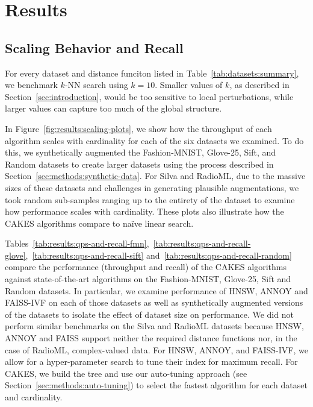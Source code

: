 \section{Results}
\label{sec:results}


\subsection{Scaling Behavior and Recall}
\label{sec:results:scaling-behavior-and-recall}

For every dataset and distance funciton listed in Table~\ref{tab:datasets:summary}, we benchmark $k$-NN search using $k=10$.
Smaller values of $k$, as described in Section~\ref{sec:introduction}, would be too sensitive to local perturbations, while larger values can capture too much of the global structure.

In Figure~\ref{fig:results:scaling-plots}, we show how the throughput of each algorithm scales with cardinality for each of the six datasets we examined.
To do this, we synthetically augmented the Fashion-MNIST, Glove-25, Sift, and Random datasets to create larger datasets using the process described in Section~\ref{sec:methods:synthetic-data}.
For Silva and RadioML, due to the massive sizes of these datasets and challenges in generating plausible augmentations, we took random sub-samples ranging up to the entirety of the dataset to examine how performance scales with cardinality.
These plots also illustrate how the CAKES algorithms compare to na\"{i}ve linear search.

Tables~\ref{tab:results:qps-and-recall-fmn},~\ref{tab:results:qps-and-recall-glove},~\ref{tab:results:qps-and-recall-sift} and~\ref{tab:results:qps-and-recall-random} compare the performance (throughput and recall) of the CAKES algorithms against state-of-the-art algorithms on the Fashion-MNIST, Glove-25, Sift and Random datasets.
In particular, we examine performance of HNSW, ANNOY and FAISS-IVF on each of those datasets as well as synthetically augmented versions of the datasets to isolate the effect of dataset size on performance.
We did not perform similar benchmarks on the Silva and RadioML datasets because HNSW, ANNOY and FAISS support neither the required distance functions nor, in the case of RadioML, complex-valued data.
For HNSW, ANNOY, and FAISS-IVF, we allow for a hyper-parameter search to tune their index for maximum recall.
For CAKES, we build the tree and use our auto-tuning approach (see Section~\ref{sec:methods:auto-tuning}) to select the fastest algorithm for each dataset and cardinality.


